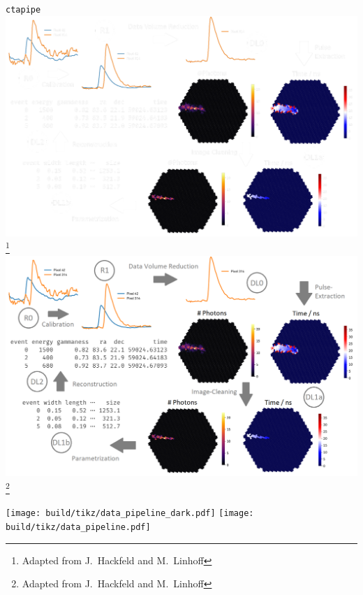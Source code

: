 \begin{frame}{\texttt{ctapipe}}
    {%
    \centering
    \includegraphics[height=0.9\textheight]{graphics/ctapipe_light.pdf}
    \vspace{-0.25cm}
    \footnote{\textcolor{white!85!black}{Adapted from J.~Hackfeld and M.~Linhoff}}
    }
    {%
    \centering
    \includegraphics[height=0.9\textheight]{graphics/ctapipe.png}
    \vspace{-0.25cm}
    \footnote{\textcolor{darkgray!85!black}{Adapted from J.~Hackfeld and M.~Linhoff}}
    }
\end{frame}

\begin{frame}
    {%
    \centering
    \texttt{[image: build/tikz/data\_pipeline\_dark.pdf]}
    }
    {%
    \centering
    \texttt{[image: build/tikz/data\_pipeline.pdf]}
    }
\end{frame}

